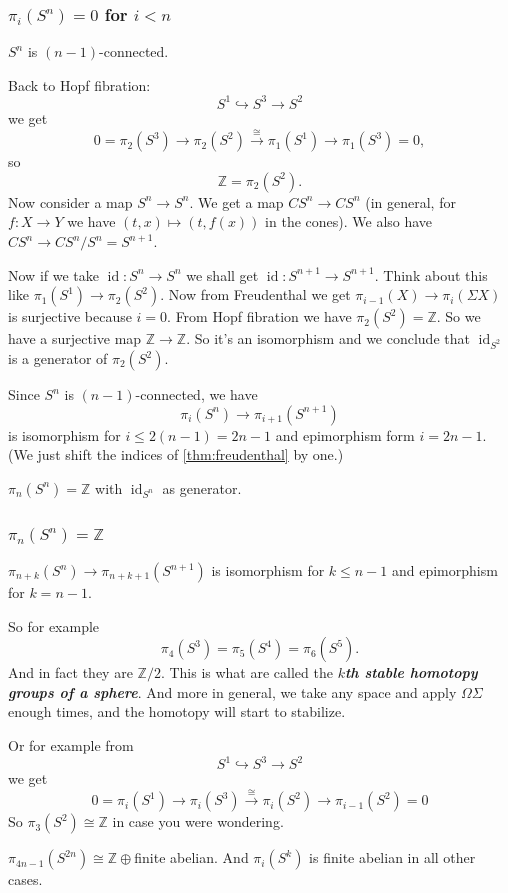\subsubsection{\texorpdfstring{$\pi_{i}(S^{n})=0$}{πᵢ(Sⁿ)} for \texorpdfstring{$i<n$}{i<n}}

\begin{coro}
	$S^n$ is $(n-1)$-connected.
\end{coro}
Back to Hopf fibration:
\[S^1\hookrightarrow S^3\to S^2\]
we get
\[0=\pi_2(S^3)\to\pi_2(S^2)\overset{\cong}{\to}\pi_1(S^1)\to\pi_1(S^3)=0,\]
so
\[\mathbb{Z}=\pi_2(S^2).\]
Now consider a map $S^n\to S^n$. We get a map $CS^n\to CS^n$ (in general, for $f:X\to Y$ we have $(t,x)\mapsto(t,f(x))$ in the cones). We also have $CS^n\to CS^n/S^n=S^{n+1}$.

Now if we take $\operatorname{id}:S^n\to S^n$ we shall get $\operatorname{id}:S^{n+1}\to S^{n+1}$. Think about this like $\pi_1(S^1)\to\pi_2(S^2)$. Now from Freudenthal we get $\pi_{i-1}(X)\to\pi_i(\Sigma X)$ is surjective because $i=0$. From Hopf fibration we have $\pi_2(S^2)=\mathbb{Z}$. So we have a surjective map $\mathbb{Z}\to\mathbb{Z}$. So it's an isomorphism and we conclude that $\operatorname{id}_{S^2}$ is a generator of $\pi_2(S^2)$.
\begin{coro}
	Since $S^n$ is $(n-1)$-connected, we have
	\[\pi_i(S^n)\to\pi_{i+1}(S^{n+1})\]
	is isomorphism for $i\leq 2(n-1)=2n-1$ and epimorphism form $i=2n-1$. (We just shift the indices of \cref{thm:freudenthal} by one.)
\end{coro}
\begin{coro}
	$\pi_n(S^n)=\mathbb{Z}$ with $\operatorname{id}_{S^n}$ as generator.
\end{coro}

\subsubsection{$\pi_{n}(S^{n})=\mathbb{Z}$}
\begin{coro}
	$\pi_{n+k}(S^n)\to\pi_{n+k+1}(S^{n+1})$ is isomorphism for $k\leq n-1$ and epimorphism for $k=n-1$.
\end{coro}
So for example
\[\pi_4(S^3)=\pi_5(S^4)=\pi_6(S^5).\]
And in fact they are $\mathbb{Z}/2$. This is what are called the \textbf{\textit{$k$th stable homotopy groups of a sphere}}. And more in general, we take any space and apply $\Omega\Sigma$ enough times, and the homotopy will start to stabilize.

Or for example from
\[S^1\hookrightarrow S^3\to S^2\]
we get
\[0=\pi_i(S^1)\to \pi_i(S^3)\overset{\cong}{\to}\pi_i(S^2)\to\pi_{i-1}(S^2)=0\]
So $\pi_3(S^2)\cong\mathbb{Z}$ in case you were wondering.
\begin{claim}[Serre]
	$\pi_{4n-1}(S^{2n})\cong\mathbb{Z}\oplus$finite abelian. And $\pi_i(S^k)$ is finite abelian in all other cases.
\end{claim}

